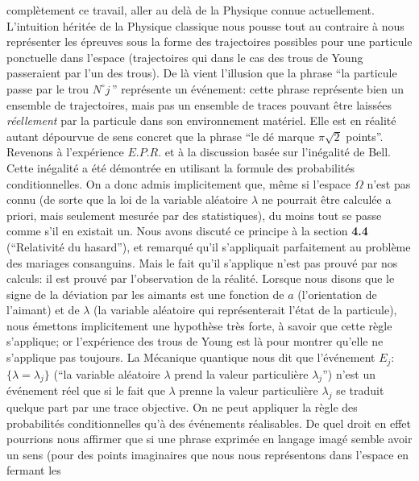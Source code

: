 compl\`etement ce travail, aller au del\`a de la Physique connue 
actuellement. L'intuition h\'erit\'ee de la Physique classique nous 
pousse tout au contraire \`a  nous repr\'esenter les \'epreuves sous la 
forme des trajectoires  possibles pour une parti\-cule ponctuelle dans 
l'espace (trajectoires  qui dans le cas des  trous de Young  passeraient 
par l'un des trous). De l\`a vient l'illusion que la phrase ``la particule 
passe par le trou $N^\circ j\,$'' repr\'esente  un \'ev\'enement: cette 
phrase repr\'esente bien un ensemble  de trajectoires, mais pas un 
ensemble de traces pouvant \^etre laiss\'ees {\it r\'eellement}  par la 
particule dans son environnement mat\'eriel.  Elle est en r\'ealit\'e 
autant d\'epourvue de sens concret que la phrase  ``le d\'e marque 
$\pi\sqrt{2}$ points''.     
\medskip  
Revenons \`a l'exp\'erience $E.P.R.$ et \`a la discussion bas\'ee sur
l'in\'egalit\'e de Bell.  Cette in\'egalit\'e a \'et\'e d\'emontr\'ee en
utilisant la formule des probabilit\'es conditionnelles.  On a donc admis
implicitement que, m\^eme si l'espace $\Omega$ n'est pas connu (de 
sorte que la loi de la variable al\'eatoire $\lambda$ ne  pourrait \^etre
calcul\'ee a priori, mais seulement mesur\'ee par des statistiques), 
du moins tout se passe comme s'il en existait un. Nous avons discut\'e 
ce principe \`a la section {\bf 4.4} (``Relativit\'e du hasard''), 
et remarqu\'e qu'il s'appliquait parfaitement au probl\`eme des mariages 
consanguins.  Mais le fait qu'il s'applique n'est pas prouv\'e par nos
calculs:  il est prouv\'e par l'observation de la r\'ealit\'e.
\medskip
Lorsque nous disons que le signe de la d\'eviation par les 
aimants est une fonction de $a$ (l'orientation de l'aimant) et de 
$\lambda$ (la variable al\'eatoire qui repr\'esenterait l'\'etat de la 
particule), nous \'emettons implicitement une hypoth\`ese tr\`es forte, 
\`a savoir que cette r\`egle s'applique; or l'exp\'erience des trous de 
Young est l\`a pour montrer qu'elle ne s'applique pas toujours. La 
M\'ecanique quantique nous dit que l'\'ev\'enement $E_j$: $\{  \lambda = 
\lambda_j \}$ (``la variable al\'eatoire $\lambda$ prend la valeur 
particuli\`ere $\lambda_j$'') n'est un \'ev\'enement r\'eel que si le fait 
que $\lambda$ prenne la valeur particuli\`ere $\lambda_j$ se traduit 
quelque  part par une trace objective. On ne peut appliquer la r\`egle des  
probabilit\'es conditionnelles qu'\`a des \'ev\'enements r\'ealisables.  
De quel droit en effet pourrions nous  affirmer que si une phrase 
exprim\'ee en langage imag\'e  semble avoir un sens (pour des points 
imaginaires que nous nous repr\'esentons dans l'espace en fermant les 
